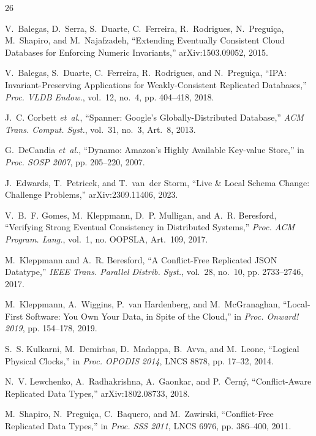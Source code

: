 \documentclass[conference]{IEEEtran}
\begin{document}
\begin{thebibliography}{26}

V.~Balegas, D.~Serra, S.~Duarte, C.~Ferreira, R.~Rodrigues, N.~Pregui{\c{c}}a, M.~Shapiro, and M.~Najafzadeh, ``Extending Eventually Consistent Cloud Databases for Enforcing Numeric Invariants,'' arXiv:1503.09052, 2015.

V.~Balegas, S.~Duarte, C.~Ferreira, R.~Rodrigues, and N.~Pregui{\c{c}}a, ``IPA: Invariant-Preserving Applications for Weakly-Consistent Replicated Databases,'' \emph{Proc. VLDB Endow.}, vol.~12, no.~4, pp. 404--418, 2018.

J.~C. Corbett \emph{et~al.}, ``Spanner: Google's Globally-Distributed Database,'' \emph{ACM Trans. Comput. Syst.}, vol.~31, no.~3, Art.~8, 2013.

G.~DeCandia \emph{et~al.}, ``Dynamo: Amazon's Highly Available Key-value Store,'' in \emph{Proc. SOSP 2007}, pp. 205--220, 2007.

J.~Edwards, T.~Petricek, and T.~van~der Storm, ``Live \& Local Schema Change: Challenge Problems,'' arXiv:2309.11406, 2023.

V.~B.~F. Gomes, M.~Kleppmann, D.~P. Mulligan, and A.~R. Beresford, ``Verifying Strong Eventual Consistency in Distributed Systems,'' \emph{Proc. ACM Program. Lang.}, vol.~1, no. OOPSLA, Art.~109, 2017.

M.~Kleppmann and A.~R. Beresford, ``A Conflict-Free Replicated JSON Datatype,'' \emph{IEEE Trans. Parallel Distrib. Syst.}, vol.~28, no.~10, pp. 2733--2746, 2017.

M.~Kleppmann, A.~Wiggins, P.~van Hardenberg, and M.~McGranaghan, ``Local-First Software: You Own Your Data, in Spite of the Cloud,'' in \emph{Proc. Onward! 2019}, pp. 154--178, 2019.

S.~S. Kulkarni, M.~Demirbas, D.~Madappa, B.~Avva, and M.~Leone, ``Logical Physical Clocks,'' in \emph{Proc. OPODIS 2014}, LNCS 8878, pp. 17--32, 2014.

N.~V. Lewchenko, A.~Radhakrishna, A.~Gaonkar, and P.~{\v{C}}ern{\'y}, ``Conflict-Aware Replicated Data Types,'' arXiv:1802.08733, 2018.

M.~Shapiro, N.~Pregui{\c{c}}a, C.~Baquero, and M.~Zawirski, ``Conflict-Free Replicated Data Types,'' in \emph{Proc. SSS 2011}, LNCS 6976, pp. 386--400, 2011.


\end{thebibliography}
\end{document}
